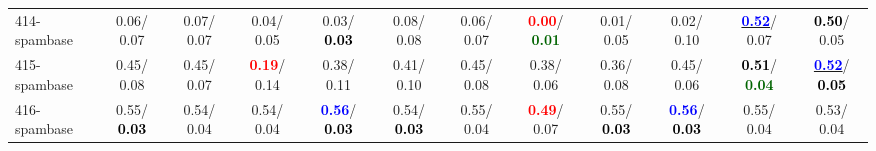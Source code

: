 \begin{table}[h]
\begin{center}
{\begin{tabular}{lc|c|c|c|c|c|c|c|c|c|c}
414-spambase &   0.06/  0.07 &   0.07/  0.07 &   0.04/  0.05 &   0.03/\textcolor{black}{\textbf{  0.03}} &   0.08/  0.08 &   0.06/  0.07 & \textcolor{red}{\textbf{  0.00}}/\textcolor{darkgreen}{\textbf{  0.01}} &   0.01/  0.05 &   0.02/  0.10 & \underline{\textcolor{blue}{\textbf{  0.52}}}/  0.07 & \textcolor{black}{\textbf{  0.50}}/  0.05 \\
415-spambase &   0.45/  0.08 &   0.45/  0.07 & \textcolor{red}{\textbf{  0.19}}/  0.14 &   0.38/  0.11 &   0.41/  0.10 &   0.45/  0.08 &   0.38/  0.06 &   0.36/  0.08 &   0.45/  0.06 & \textcolor{black}{\textbf{  0.51}}/\textcolor{darkgreen}{\textbf{  0.04}} & \underline{\textcolor{blue}{\textbf{  0.52}}}/\textcolor{black}{\textbf{  0.05}} \\
416-spambase &   0.55/\textcolor{black}{\textbf{  0.03}} &   0.54/  0.04 &   0.54/  0.04 & \textcolor{blue}{\textbf{  0.56}}/\textcolor{black}{\textbf{  0.03}} &   0.54/\textcolor{black}{\textbf{  0.03}} &   0.55/  0.04 & \textcolor{red}{\textbf{  0.49}}/  0.07 &   0.55/\textcolor{black}{\textbf{  0.03}} & \textcolor{blue}{\textbf{  0.56}}/\textcolor{black}{\textbf{  0.03}} &   0.55/  0.04 &   0.53/  0.04 \\\end{tabular}}\label{stratsALCKappa12AllReduxHalfa}
\end{center}
\end{table}

